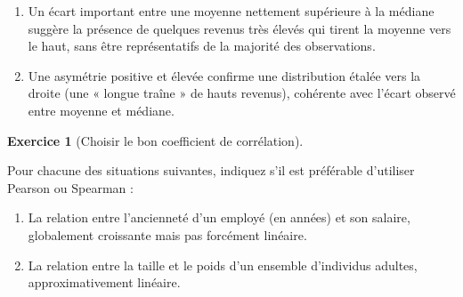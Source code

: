 \documentclass[
  french,
  letterpaper,
  open=any]{scrbook}
\providecommand{\tightlist}{%
  \setlength{\itemsep}{0pt}\setlength{\parskip}{0pt}}
\theoremstyle{definition}
\theoremstyle{definition}
\newtheorem{exercise}{Exercice}[section]
\theoremstyle{remark}
\begin{document}
\begin{tcolorbox}[enhanced jigsaw, arc=.35mm, bottomrule=.15mm, bottomtitle=1mm, breakable, colback=white, colbacktitle=quarto-callout-tip-color!10!white, colframe=quarto-callout-tip-color-frame, coltitle=black, left=2mm, leftrule=.75mm, opacityback=0, opacitybacktitle=0.6, rightrule=.15mm, title=\textcolor{quarto-callout-tip-color}{\faLightbulb}\hspace{0.5em}{Solution de l'exercice Exercice~\ref{exr-eda-1}}, titlerule=0mm, toprule=.15mm, toptitle=1mm]

\begin{enumerate}
\def\labelenumi{\alph{enumi}.}
\tightlist
\item
  Un écart important entre une moyenne nettement supérieure à la médiane
  suggère la présence de quelques revenus très élevés qui tirent la
  moyenne vers le haut, sans être représentatifs de la majorité des
  observations.
\item
  Une asymétrie positive et élevée confirme une distribution étalée vers
  la droite (une « longue traîne » de hauts revenus), cohérente avec
  l'écart observé entre moyenne et médiane.
\end{enumerate}

\end{tcolorbox}

\begin{exercise}[Choisir le bon coefficient de
corrélation]\protect\hypertarget{exr-eda-2}{}\label{exr-eda-2}

Pour chacune des situations suivantes, indiquez s'il est préférable
d'utiliser Pearson ou Spearman :

\begin{enumerate}
\def\labelenumi{\alph{enumi}.}
\tightlist
\item
  La relation entre l'ancienneté d'un employé (en années) et son
  salaire, globalement croissante mais pas forcément linéaire.
\item
  La relation entre la taille et le poids d'un ensemble d'individus
  adultes, approximativement linéaire.
\end{enumerate}

\end{exercise}
\end{document}
